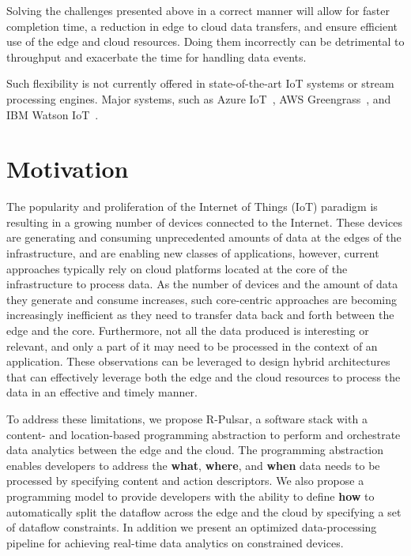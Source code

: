 Solving the challenges presented above in a correct manner will allow for faster completion time, a reduction in edge to cloud data transfers, and ensure efficient use of the edge and cloud resources. Doing them incorrectly can be detrimental to throughput and exacerbate the time for handling data events.
 
Such flexibility is not currently offered in state-of-the-art IoT systems or stream processing engines. Major systems, such as Azure IoT~\cite{azure}, AWS Greengrass~\cite{amazon}, and IBM Watson IoT~\cite{IBM}.

\section{Motivation}

The popularity and proliferation of the Internet of Things (IoT) paradigm is resulting in a growing number of devices connected to the Internet. These devices are generating and consuming unprecedented amounts of data at the edges of the infrastructure, and are enabling new classes of applications, however, current approaches typically rely on cloud platforms located at the core of the infrastructure to process data. As the number of devices and the amount of data they generate and consume increases, such core-centric approaches are becoming increasingly inefficient as they need to transfer data back and forth between the edge and the core. Furthermore, not all the data produced is interesting or relevant, and only a part of it may need to be processed in the context of an application. These observations can be leveraged to design hybrid architectures that can effectively leverage both the edge and the cloud resources to process the data in an effective and timely manner\cite{ahmed2017role, satyanarayanan2015edge}.

To address these limitations, we propose R-Pulsar, a software stack with a content- and location-based programming abstraction to perform and orchestrate data analytics between the edge and the cloud. The programming abstraction enables developers to address the \textbf{what}, \textbf{where}, and \textbf{when} data needs to be processed by specifying content and action descriptors. We also propose a programming model to provide developers with the ability to define \textbf{how} to automatically split the dataflow across the edge and the cloud by specifying a set of dataflow constraints. In addition we present an optimized data-processing pipeline for achieving real-time data analytics on constrained devices.

